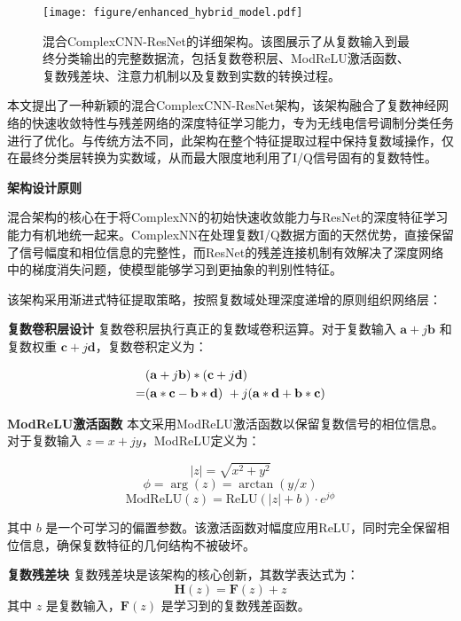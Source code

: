 \documentclass{article}
\begin{document}
\begin{figure}[htbp]
\centering
\texttt{[image: figure/enhanced\_hybrid\_model.pdf]}
\caption{混合ComplexCNN-ResNet的详细架构。该图展示了从复数输入到最终分类输出的完整数据流，包括复数卷积层、ModReLU激活函数、复数残差块、注意力机制以及复数到实数的转换过程。}
\label{fig:enhanced_hybrid_model}
\end{figure}

本文提出了一种新颖的混合ComplexCNN-ResNet架构，该架构融合了复数神经网络的快速收敛特性与残差网络的深度特征学习能力，专为无线电信号调制分类任务进行了优化。与传统方法不同，此架构在整个特征提取过程中保持复数域操作，仅在最终分类层转换为实数域，从而最大限度地利用了I/Q信号固有的复数特性。

\textbf{架构设计原则}

混合架构的核心在于将ComplexNN的初始快速收敛能力与ResNet的深度特征学习能力有机地统一起来。ComplexNN在处理复数I/Q数据方面的天然优势，直接保留了信号幅度和相位信息的完整性，而ResNet的残差连接机制有效解决了深度网络中的梯度消失问题，使模型能够学习到更抽象的判别性特征。

该架构采用渐进式特征提取策略，按照复数域处理深度递增的原则组织网络层：

\textbf{复数卷积层设计} 复数卷积层执行真正的复数域卷积运算。对于复数输入 $\mathbf{a} + j\mathbf{b}$ 和复数权重 $\mathbf{c} + j\mathbf{d}$，复数卷积定义为：

\begin{align}
&(\mathbf{a} + j\mathbf{b}) * (\mathbf{c} + j\mathbf{d}) \notag \\
= &(\mathbf{a} * \mathbf{c} - \mathbf{b} * \mathbf{d}) 
+ j(\mathbf{a} * \mathbf{d} + \mathbf{b} * \mathbf{c})
\end{align}

\textbf{ModReLU激活函数} 本文采用ModReLU激活函数以保留复数信号的相位信息。对于复数输入 $z = x + jy$，ModReLU定义为：

\begin{equation}
|z| = \sqrt{x^2 + y^2}
\end{equation}
\begin{equation}
\phi = \arg(z) = \arctan(y/x)
\end{equation}
\begin{equation}
\text{ModReLU}(z) = \text{ReLU}(|z| + b) \cdot e^{j\phi}
\end{equation}

其中 $b$ 是一个可学习的偏置参数。该激活函数对幅度应用ReLU，同时完全保留相位信息，确保复数特征的几何结构不被破坏。

\textbf{复数残差块} 复数残差块是该架构的核心创新，其数学表达式为：
\begin{equation}
\mathbf{H}(z) = \mathbf{F}(z) + z
\end{equation}
其中 $z$ 是复数输入，$\mathbf{F}(z)$ 是学习到的复数残差函数。
\end{document}
